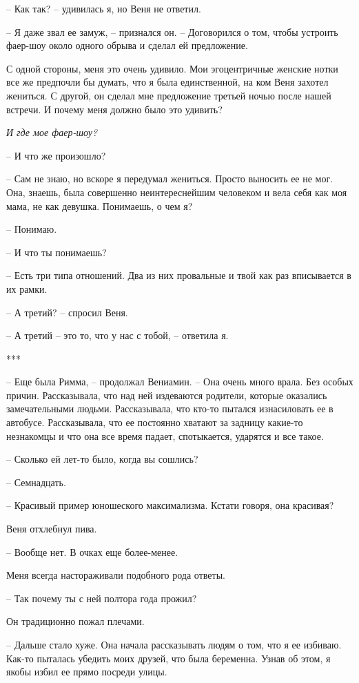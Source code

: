\documentclass[
]{book}
\begin{document}
-- Как так? -- удивилась я, но Веня не ответил.

-- Я даже звал ее замуж, -- признался он. -- Договорился о том, чтобы устроить фаер-шоу около одного обрыва и сделал ей предложение.

С одной стороны, меня это очень удивило. Мои эгоцентричные женские нотки все же предпочли бы думать, что я была единственной, на ком Веня захотел жениться. С другой, он сделал мне предложение третьей ночью после нашей встречи. И почему меня должно было это удивить?

\emph{И где мое фаер-шоу?}

-- И что же произошло?

-- Сам не знаю, но вскоре я передумал жениться. Просто выносить ее не мог. Она, знаешь, была совершенно неинтереснейшим человеком и вела себя как моя мама, не как девушка. Понимаешь, о чем я?

-- Понимаю.

-- И что ты понимаешь?

-- Есть три типа отношений. Два из них провальные и твой как раз вписывается в их рамки.

-- А третий? -- спросил Веня.

-- А третий -- это то, что у нас с тобой, -- ответила я.

***

-- Еще была Римма, -- продолжал Вениамин. -- Она очень много врала. Без особых причин. Рассказывала, что над ней издеваются родители, которые оказались замечательными людьми. Рассказывала, что кто-то пытался изнасиловать ее в автобусе. Рассказывала, что ее постоянно хватают за задницу какие-то незнакомцы и что она все время падает, спотыкается, ударятся и все такое.

-- Сколько ей лет-то было, когда вы сошлись?

-- Семнадцать.

-- Красивый пример юношеского максимализма. Кстати говоря, она красивая?

Веня отхлебнул пива.

-- Вообще нет. В очках еще более-менее.

Меня всегда настораживали подобного рода ответы.

-- Так почему ты с ней полтора года прожил?

Он традиционно пожал плечами.

-- Дальше стало хуже. Она начала рассказывать людям о том, что я ее избиваю. Как-то пыталась убедить моих друзей, что была беременна. Узнав об этом, я якобы избил ее прямо посреди улицы.
\end{document}
